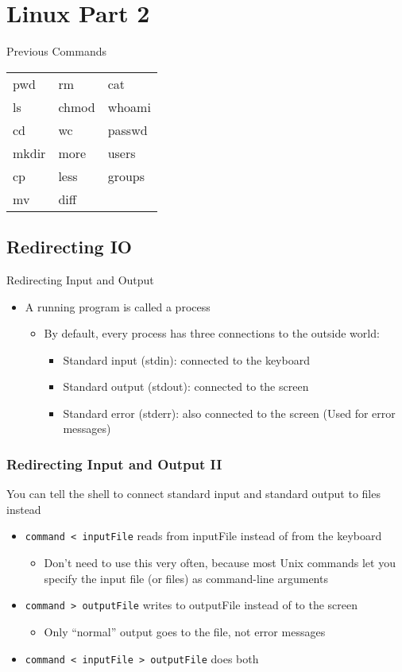 \section{Linux Part 2}
\begin{frame}{Previous Commands}
\begin{tabular}{|l|l|l|}
pwd & rm & cat\\
ls & chmod & whoami\\
cd & wc & passwd\\
mkdir & more & users\\
cp & less & groups\\
mv & diff & 
\end{tabular}
\end{frame}

\subsection{Redirecting IO}

\begin{frame}{Redirecting Input and Output}
\begin{itemize}
\item A running program is called a process
\begin{itemize}
\item By default, every process has three connections to the outside world:
\begin{itemize}
    \item Standard input (stdin): connected to the keyboard
    \item Standard output (stdout): connected to the screen
    \item Standard error (stderr): also connected to the screen (Used for error messages)
\end{itemize}
\end{itemize}
\end{itemize}
\end{frame}

\begin{frame}[fragile]\frametitle{Redirecting Input and Output II}
You can tell the shell to connect standard input and standard output to files instead
\begin{itemize}
    \item \lstinline!command < inputFile! reads from inputFile instead of from the keyboard
\begin{itemize}
          \item Don't need to use this very often, because most Unix commands let you specify the input file (or files) as command-line arguments
\end{itemize}
    \item \lstinline!command > outputFile! writes to outputFile instead of to the screen
\begin{itemize}
          \item Only “normal” output goes to the file, not error messages
\end{itemize}
    \item \lstinline!command < inputFile > outputFile! does both
\end{itemize}
\end{frame}

